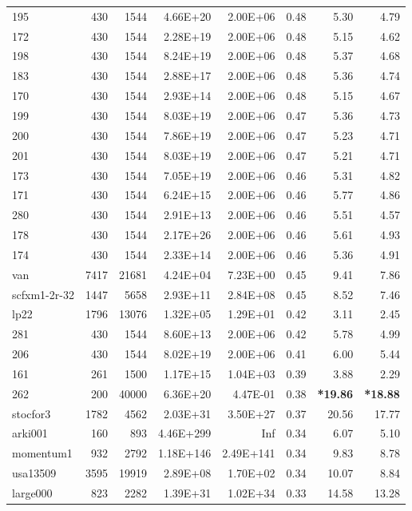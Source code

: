 \documentclass[10pt]{article}
\newcommand{\red}{
	\color{red}	
	}
\begin{document}
\begin{longtable}{|l|r|r|r|r|r|r|r|}
195	&	430	&	1544	&	4.66E+20	&	2.00E+06	&	0.48	&	5.30	&	4.79	\\
172	&	430	&	1544	&	2.28E+19	&	2.00E+06	&	0.48	&	5.15	&	4.62	\\
198	&	430	&	1544	&	8.24E+19	&	2.00E+06	&	0.48	&	5.37	&	4.68	\\
183	&	430	&	1544	&	2.88E+17	&	2.00E+06	&	0.48	&	5.36	&	4.74	\\
170	&	430	&	1544	&	2.93E+14	&	2.00E+06	&	0.48	&	5.15	&	4.67	\\
199	&	430	&	1544	&	8.03E+19	&	2.00E+06	&	0.47	&	5.36	&	4.73	\\
200	&	430	&	1544	&	7.86E+19	&	2.00E+06	&	0.47	&	5.23	&	4.71	\\
201	&	430	&	1544	&	8.03E+19	&	2.00E+06	&	0.47	&	5.21	&	4.71	\\
173	&	430	&	1544	&	7.05E+19	&	2.00E+06	&	0.46	&	5.31	&	4.82	\\
171	&	430	&	1544	&	6.24E+15	&	2.00E+06	&	0.46	&	5.77	&	4.86	\\
280	&	430	&	1544	&	2.91E+13	&	2.00E+06	&	0.46	&	5.51	&	4.57	\\
178	&	430	&	1544	&	2.17E+26	&	2.00E+06	&	0.46	&	5.61	&	4.93	\\
174	&	430	&	1544	&	2.33E+14	&	2.00E+06	&	0.46	&	5.36	&	4.91	\\
van	&	7417	&	21681	&	4.24E+04	&	7.23E+00	&	0.45	&	9.41	&	7.86	\\
scfxm1-2r-32	&	1447	&	5658	&	2.93E+11	&	2.84E+08	&	0.45	&	8.52	&	7.46	\\
lp22	&	1796	&	13076	&	1.32E+05	&	1.29E+01	&	0.42	&	3.11	&	2.45	\\
281	&	430	&	1544	&	8.60E+13	&	2.00E+06	&	0.42	&	5.78	&	4.99	\\
206	&	430	&	1544	&	8.02E+19	&	2.00E+06	&	0.41	&	6.00	&	5.44	\\
161	&	261	&	1500	&	1.17E+15	&	1.04E+03	&	0.39	&	3.88	&	2.29	\\
262	&	200	&	40000	&	6.36E+20	&	4.47E-01	&	0.38	&	{\bf \red *19.86}	&	{\bf \red *18.88}	\\
stocfor3	&	1782	&	4562	&	2.03E+31	&	3.50E+27	&	0.37	&	20.56	&	17.77	\\
arki001	&	160	&	893	&	4.46E+299	&	Inf	&	0.34	&	6.07	&	5.10	\\
momentum1	&	932	&	2792	&	1.18E+146	&	2.49E+141	&	0.34	&	9.83	&	8.78	\\
usa13509	&	3595	&	19919	&	2.89E+08	&	1.70E+02	&	0.34	&	10.07	&	8.84	\\
large000	&	823	&	2282	&	1.39E+31	&	1.02E+34	&	0.33	&	14.58	&	13.28	\\

\end{longtable}
\end{document}
